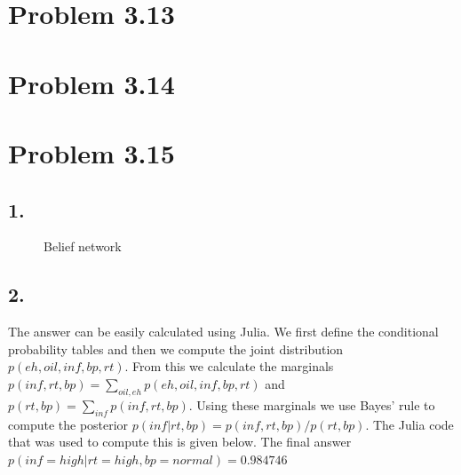 \documentclass[11pt,a4paper,oneside]{report}
\begin{document}
\section*{Problem 3.13}


\section*{Problem 3.14}


\section*{Problem 3.15}

\subsection*{1.}
\begin{figure}[H]
  \centering
    \caption{Belief network}
    \label{fig:all_trade_cca_black}     
\end{figure}


\subsection*{2.}

The answer can be easily calculated using Julia. We first define the 
conditional probability tables and then we compute the joint distribution 
$p(eh, oil, inf, bp, rt)$. From this we calculate the marginals $p(inf,rt,bp) 
= \sum_{oil, eh}p(eh, oil, inf, bp, rt)$ and $p(rt,bp) = 
\sum_{inf}p(inf, rt, bp)$. Using these marginals we use Bayes' rule to compute 
the posterior $p(inf|rt, bp) = p(inf, rt, bp)/p(rt, bp)$. The Julia code that 
was used to compute this is given below. The final answer $p(inf = high | rt 
= high, bp = normal) = 0.984746 $\\
\end{document}
